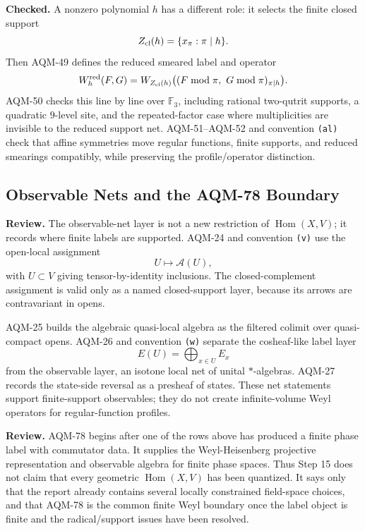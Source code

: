 \textbf{Checked.}  A nonzero polynomial \(h\) has a different role: it
selects the finite closed support
\[
  Z_{\rm cl}(h)=\{x_\pi:\pi\mid h\}.
\]
Then AQM-49 defines the reduced smeared label and operator
\[
  W_h^{\rm red}(F,G)
  =
  W_{Z_{\rm cl}(h)}
  \bigl((F\bmod\pi,\ G\bmod\pi)_{\pi\mid h}\bigr).
\]
AQM-50 checks this line by line over \(\mathbb F_3\), including rational
two-qutrit supports, a quadratic \(9\)-level site, and the repeated-factor
case where multiplicities are invisible to the reduced support net.
AQM-51--AQM-52 and convention \texttt{(al)} check that affine symmetries move
regular functions, finite supports, and reduced smearings compatibly, while
preserving the profile/operator distinction.

\subsection{Observable Nets and the AQM-78 Boundary}

\textbf{Review.}  The observable-net layer is not a new restriction of
\(\operatorname{Hom}(X,V)\); it records where finite labels are supported.
AQM-24 and convention \texttt{(v)} use the open-local assignment
\[
  U\longmapsto\mathcal A(U),
\]
with \(U\subset V\) giving tensor-by-identity inclusions.  The
closed-complement assignment is valid only as a named closed-support layer,
because its arrows are contravariant in opens.

AQM-25 builds the algebraic quasi-local algebra as the filtered colimit over
quasi-compact opens.  AQM-26 and convention \texttt{(w)} separate the
cosheaf-like label layer
\[
  E(U)=\bigoplus_{x\in U}E_x
\]
from the observable layer, an isotone local net of unital \(*\)-algebras.
AQM-27 records the state-side reversal as a presheaf of states.  These net
statements support finite-support observables; they do not create
infinite-volume Weyl operators for regular-function profiles.

\textbf{Review.}  AQM-78 begins after one of the rows above has produced a
finite phase label with commutator data.  It supplies the Weyl-Heisenberg
projective representation and observable algebra for finite phase spaces.
Thus Step 15 does not claim that every geometric
\(\operatorname{Hom}(X,V)\) has been quantized.  It says only that the report
already contains several locally constrained field-space choices, and that
AQM-78 is the common finite Weyl boundary once the label object is finite and
the radical/support issues have been resolved.

